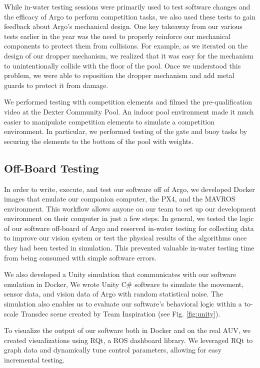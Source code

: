 \documentclass[conference]{IEEEtran}
\begin{document}
While in-water testing sessions were primarily used to test software changes and the efficacy of Argo to perform competition tasks, we also used these tests to gain feedback about Argo's mechanical design. One key takeaway from our various tests earlier in the year was the need to properly reinforce our mechanical components to protect them from collisions. For example, as we iterated on the design of our dropper mechanism, we realized that it was easy for the mechanism to unintentionally collide with the floor of the pool. Once we understood this problem, we were able to reposition the dropper mechanism and add metal guards to protect it from damage.

We performed testing with competition elements and filmed the pre-qualification video at the Dexter Community Pool. An indoor pool environment made it much easier to manipulate competition elements to simulate a competition environment. In particular, we performed testing of the gate and buoy tasks by securing the elements to the bottom of the pool with weights.


\subsection{Off-Board Testing}
\label{ssec:off_board_testing}
In order to write, execute, and test our software off of Argo, we developed Docker images that emulate our companion computer, the PX4, and the MAVROS environment. This workflow allows anyone on our team to set up our development environment on their computer in just a few steps. In general, we tested the logic of our software off-board of Argo and reserved in-water testing for collecting data to improve our vision system or test the physical results of the algorithms once they had been tested in simulation. This prevented valuable in-water testing time from being consumed with simple software errors.

We also developed a Unity simulation that communicates with our software emulation in Docker, We wrote Unity C\# software to simulate the movement, sensor data, and vision data of Argo with random statistical noise. The simulation also enables us to evaluate our software's behavioral logic within a to-scale Transdec scene created by Team Inspiration (see Fig. \ref{fig:unity}).

To visualize the output of our software both in Docker and on the real AUV, we created visualizations using RQt, a ROS dashboard library. We leveraged RQt to graph data and dynamically tune control parameters, allowing for easy incremental testing.
\end{document}
